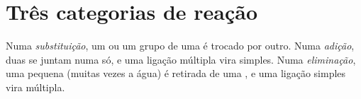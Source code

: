 \section{Três categorias de reação}

\begin{definition}\label{def:g12:curly-arrows:categories}
Numa \emph{substituição}, um  ou um grupo de
uma  é trocado por outro. Numa \emph{adição}, duas
 se juntam numa só, e uma ligação múltipla vira simples. Numa
\emph{eliminação}, uma  pequena (muitas vezes a
água) é retirada de uma , e uma ligação simples vira múltipla.
\end{definition}

